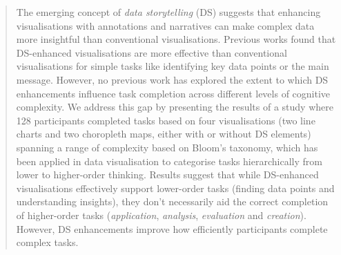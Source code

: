 \begin{abstract} 
The emerging concept of \textit{data storytelling} (DS) suggests that enhancing visualisations with annotations and narratives can make complex data more insightful than conventional visualisations. Previous works found that DS-enhanced visualisations are more effective than conventional visualisations for simple tasks like identifying key data points or the main message. However, no previous work has explored the extent to which DS enhancements influence task completion across different levels of cognitive complexity. We address this gap by presenting the results of a study where 128 participants completed tasks based on four visualisations (two line charts and two choropleth maps, either with or without DS elements) spanning a range of complexity based on Bloom's taxonomy, which has been applied in data visualisation to categorise tasks hierarchically from lower to higher-order thinking. 
Results suggest that while DS-enhanced visualisations effectively support lower-order tasks (finding data points and understanding insights), they don't necessarily aid the correct completion of higher-order tasks (\textit{application}, \textit{analysis}, \textit{evaluation} and \textit{creation}). However, DS enhancements improve how efficiently participants complete complex tasks.
\end{abstract}
